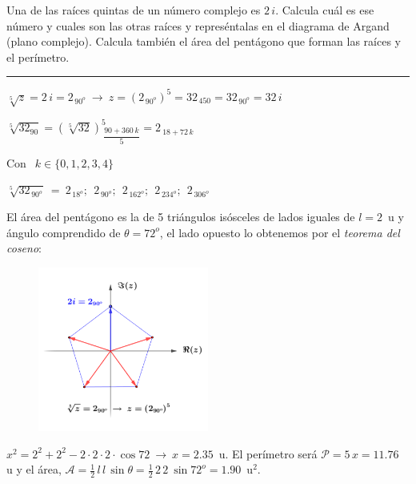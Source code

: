 \begin{miejercicio}

Una de las raíces quintas de un número complejo es $2\, i$. Calcula cuál es ese número y cuales son las otras raíces y represéntalas en el diagrama de Argand (plano complejo). Calcula también el área del pentágono que forman las raíces y el perímetro.

\rule{250pt}{0.5pt}

\begin{multicols}{2}
$\sqrt[5]{z}=2\, i=2_{\, 90^o} \ \to \ z=(2_{\, 90^o})^5=32_{\, 450}=32_{\, 90^o}=32\, i$

\vspace{2mm} $\sqrt[5]{32_{90}}=(\sqrt[5]{32})^5_{\ \dfrac{90+360\, k}{5}}=2_{\ 18+72\, k}$

\vspace{2mm} Con $\ \ k\in \{0,1,2,3,4\}$

\vspace{2mm} $\sqrt[5]{32_{\, 90^o} } \ = \ 2_{\, 18^o};\ \ 2_{\, 90^o};\ \ 2_{\, 162^o};\ \ 2_{\, 234^o};\ \ 2_{\, 306^o}  $
 
 \vspace{2mm} El área del pentágono es la de 5 triángulos isósceles de lados iguales de $l=2\, $ u y ángulo comprendido de $\theta=72^o$, el lado opuesto lo obtenemos por el \emph{teorema del coseno}:
 

\begin{figure}[H]
	\centering
	\includegraphics[width=0.5\textwidth]{img-c/comp13.png}
\end{figure}	
\end{multicols}
$x^2=2^2+2^2-2\cdot 2\cdot 2 \cdot \cos 72 \ \to \ x=2.35\, $ u. El perímetro será $\mathcal P=5\, x= 11.76\, $ u y el área, $\mathcal A=\frac 1 2\, l\, l\, \sin \theta=\frac 1 2\, 2\, 2\ \sin 72^o=1.90\, $ u$^2$.
	
\end{miejercicio}

